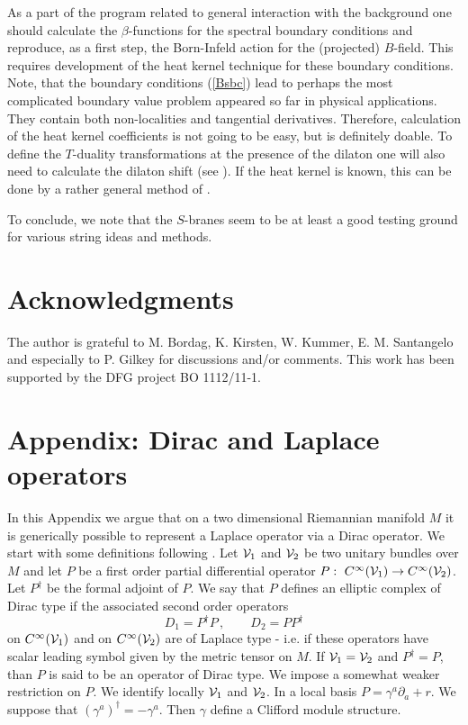 \documentclass[a4paper,12pt,twoside]{article}
\begin{document}
As a part of the program related to general interaction with
the background one should calculate the $\beta$-functions
for the spectral boundary conditions and reproduce, as a first
step, the Born-Infeld action for the (projected) $B$-field.
This requires development of the heat kernel technique
for these boundary conditions. Note, that the boundary
conditions (\ref{Bsbc}) lead to perhaps the most  complicated
boundary value problem appeared so far in physical applications.
They contain both non-localities and tangential derivatives.
Therefore, calculation of the heat kernel coefficients is not
going to be easy, but is definitely doable. To define the
$T$-duality transformations at the presence of the dilaton
one will also need to calculate the dilaton shift (see
\cite{Schwarz:1993te}). If the heat kernel is known, this can be
done by a rather general method of \cite{Vassilevich:2001kt}.

To conclude, we note  that the $S$-branes seem to be at least
a good testing ground for various string ideas and 
methods.

\section*{Acknowledgments}
The author is grateful to M. Bordag, K. Kirsten,
W. Kummer, E. M. Santangelo and especially to P. Gilkey for 
discussions and/or comments. This work has been supported
by the DFG project BO 1112/11-1.

\section*{Appendix: Dirac and Laplace operators}
In this Appendix we argue that on a two dimensional
Riemannian
manifold $M$ it is generically possible to represent a
Laplace operator via a Dirac operator. We start with
some definitions
following \cite{Dowker:2000sy}. Let ${\cal V}_1$ and ${\cal V}_2$ be
two unitary bundles over $M$ and let $P$ be a first
order partial differential operator 
$P:\ C^\infty ({\cal V}_1)\to C^\infty ({\cal V}_2)$.
Let $P^\dag$ be the formal adjoint of $P$.
We say that $P$ defines an elliptic complex of Dirac type if
the associated second order operators 
\begin{equation}
D_1=P^\dag P \,,\qquad D_2=PP^\dag \label{defDD}
\end{equation}
on $C^\infty ({\cal V}_1)$ and on $C^\infty ({\cal V}_2)$
are of Laplace type - i.e. if these operators have scalar
leading symbol given by the metric tensor on $M$. If 
${\cal V}_1={\cal V}_2$ and $P^\dag =P$, than $P$ is said to be
an operator of Dirac type. We impose a somewhat weaker restriction
on $P$. We identify locally ${\cal V}_1$ and ${\cal V}_2$.
In a local basis $P=\gamma^a\partial_a +r$. We suppose
that $(\gamma^a)^\dag =-\gamma^a$. Then $\gamma$ define
a Clifford module structure. 
\end{document}
